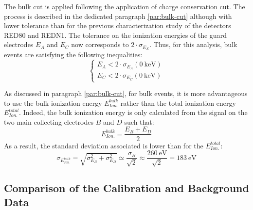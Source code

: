 The bulk cut is applied following the application of charge conservation cut. The process is described in the dedicated paragraph \ref{par:bulk-cut} although with lower tolerance than for the previous characterization study of the detectors RED80 and REDN1. The tolerance on the ionization energies of the guard electrodes $E_A$ and $E_C$ now corresponds to $2 \cdot \sigma_{E_{X}}$. Thus, for this analysis, bulk events are satisfying the following inequalities:
\begin{equation}
\begin{cases}
E_A < 2 \cdot \sigma_{E_A} \left( \SI{0}{\kilo\eV} \right) \\
E_C < 2 \cdot \sigma_{E_C} \left( \SI{0}{\kilo\eV} \right) 
\end{cases}
\end{equation}

As discussed in paragraph \ref{par:bulk-cut}, for bulk events, it is more advantageous to use the bulk ionization energy $E_{Ion.}^{bulk}$ rather than the total ionization energy $E_{Ion.}^{total}$. Indeed, the bulk ionization energy is only calculated from the signal on the two main collecting electrodes $B$ and $D$ such that:
\begin{equation}
E_{Ion.}^{bulk} = \frac{E_B + E_D}{2}
\end{equation}
As a result, the standard deviation associated is lower than for the $E_{Ion.}^{total}$:
\begin{equation}
\sigma_{E_{Ion.}^{bulk}} = \sqrt{ \sigma_{E_B}^2 + \sigma_{E_D}^2  }
\simeq \frac{\sigma_B}{\sqrt{2}}
\approx \frac{\SI{260}{\eV}}{\sqrt{2}}
= \SI{183}{\eV}
\end{equation}


\subsection{Comparison of the Calibration and Background Data}
\label{par:comparison-background-calibration}


